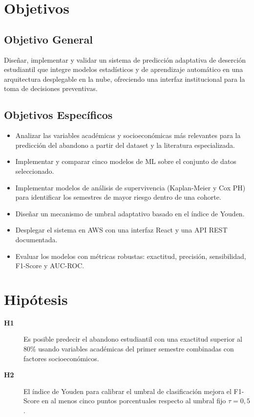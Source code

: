 \documentclass[12pt]{article}
\begin{document}
\section{Objetivos}

\subsection{Objetivo General}
Diseñar, implementar y validar un sistema de predicción adaptativa de deserción
estudiantil que integre modelos estadísticos y de aprendizaje automático en una
arquitectura desplegable en la nube, ofreciendo una interfaz institucional para la
toma de decisiones preventivas.

\subsection{Objetivos Específicos}
\begin{itemize}
    \item Analizar las variables académicas y socioeconómicas más relevantes para la
          predicción del abandono a partir del dataset y la literatura especializada.
    \item Implementar y comparar cinco modelos de ML sobre el conjunto de datos seleccionado.
    \item Implementar modelos de análisis de supervivencia (Kaplan-Meier y Cox PH)
          para identificar los semestres de mayor riesgo dentro de una cohorte.
    \item Diseñar un mecanismo de umbral adaptativo basado en el índice de Youden.
    \item Desplegar el sistema en AWS con una interfaz React y una API REST documentada.
    \item Evaluar los modelos con métricas robustas: exactitud, precisión, sensibilidad,
          F1-Score y AUC-ROC.
\end{itemize}

\section{Hipótesis}
\begin{description}
    \item[\textbf{H1}] Es posible predecir el abandono estudiantil con una exactitud
    superior al 80\% usando variables académicas del primer semestre combinadas con
    factores socioeconómicos.

    \item[\textbf{H2}] El índice de Youden para calibrar el umbral de clasificación
    mejora el F1-Score en al menos cinco puntos porcentuales respecto al umbral fijo
    $\tau = 0{,}5$.
\end{description}
\end{document}
